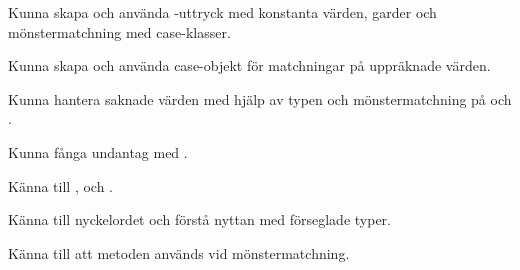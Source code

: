 

\ifPreSolution



\Exercise{\ExeWeekSIX}\label{exe:W06}

\begin{Goals}
\item Kunna skapa och använda -uttryck med konstanta värden, garder och mönstermatchning med case-klasser.
\item Kunna skapa och använda case-objekt för matchningar på uppräknade värden.
\item Kunna hantera saknade värden med hjälp av typen  och mönstermatchning på  och .
\item Kunna fånga undantag med .
\item Känna till ,  och .
\item Känna till nyckelordet  och förstå nyttan med förseglade typer.
\item Känna till att metoden  används vid mönstermatchning.
\end{Goals}

\begin{Preparations}
\item {}
\end{Preparations}

\BasicTasks %

\else



